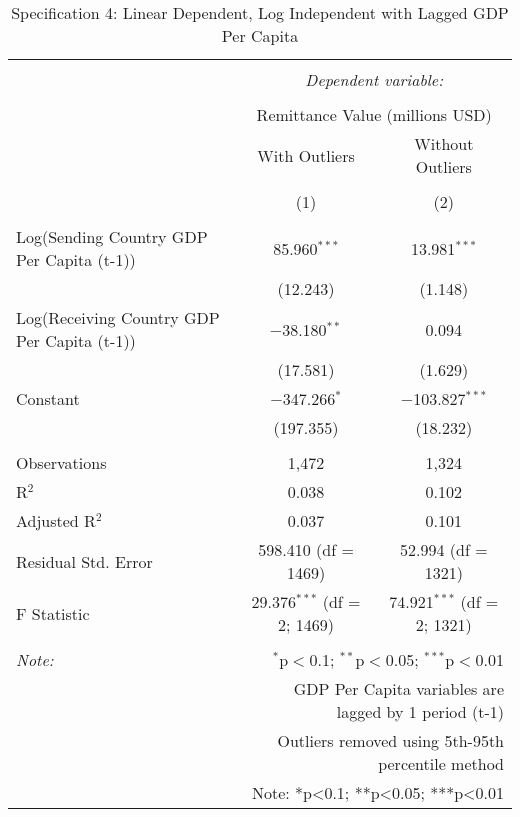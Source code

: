 
\begin{table}[!htbp] \centering 
  \caption{Specification 4: Linear Dependent, Log Independent with Lagged GDP Per Capita} 
  \label{} 
\begin{tabular}{@{\extracolsep{5pt}}lcc} 
\\[-1.8ex]\hline 
\hline \\[-1.8ex] 
 & \multicolumn{2}{c}{\textit{Dependent variable:}} \\ 
\cline{2-3} 
\\[-1.8ex] & \multicolumn{2}{c}{Remittance Value (millions USD)} \\ 
 & With Outliers & Without Outliers \\ 
\\[-1.8ex] & (1) & (2)\\ 
\hline \\[-1.8ex] 
 Log(Sending Country GDP Per Capita (t-1)) & 85.960$^{***}$ & 13.981$^{***}$ \\ 
  & (12.243) & (1.148) \\ 
  Log(Receiving Country GDP Per Capita (t-1)) & $-$38.180$^{**}$ & 0.094 \\ 
  & (17.581) & (1.629) \\ 
  Constant & $-$347.266$^{*}$ & $-$103.827$^{***}$ \\ 
  & (197.355) & (18.232) \\ 
 \hline \\[-1.8ex] 
Observations & 1,472 & 1,324 \\ 
R$^{2}$ & 0.038 & 0.102 \\ 
Adjusted R$^{2}$ & 0.037 & 0.101 \\ 
Residual Std. Error & 598.410 (df = 1469) & 52.994 (df = 1321) \\ 
F Statistic & 29.376$^{***}$ (df = 2; 1469) & 74.921$^{***}$ (df = 2; 1321) \\ 
\hline 
\hline \\[-1.8ex] 
\textit{Note:}  & \multicolumn{2}{r}{$^{*}$p$<$0.1; $^{**}$p$<$0.05; $^{***}$p$<$0.01} \\ 
 & \multicolumn{2}{r}{GDP Per Capita variables are lagged by 1 period (t-1)} \\ 
 & \multicolumn{2}{r}{Outliers removed using 5th-95th percentile method} \\ 
 & \multicolumn{2}{r}{Note: *p<0.1; **p<0.05; ***p<0.01} \\ 
\end{tabular} 
\end{table} 
